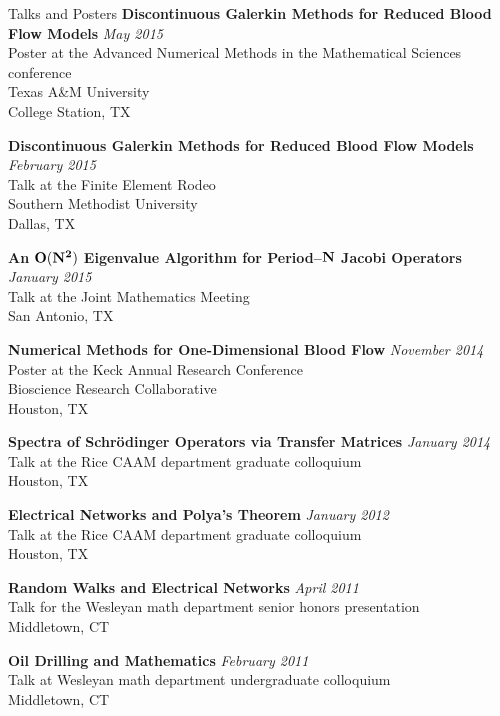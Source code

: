 \documentclass{resume} %
\begin{document}
\begin{rSection}{Talks and Posters}
{\bf Discontinuous Galerkin Methods for Reduced Blood Flow Models} \hfill{\em May 2015}\\
{\small Poster at the Advanced Numerical Methods in the Mathematical Sciences conference\\
Texas A\&M University \\
College Station, TX}

{\bf Discontinuous Galerkin Methods for Reduced Blood Flow Models} \hfill{\em February 2015}\\
{\small Talk at the Finite Element Rodeo \\
Southern Methodist University \\
Dallas, TX}

{\bf An ${\bf O(N^2)}$ Eigenvalue Algorithm for Period--${\bf N}$ Jacobi Operators} \hfill {\em January 2015} \\
{\small Talk at the Joint Mathematics Meeting \\
San Antonio, TX} 

{\bf Numerical Methods for One-Dimensional Blood Flow} \hfill {\em November 2014} \\
{\small Poster at the Keck Annual Research Conference \\
Bioscience Research Collaborative \\
Houston, TX} 

{\bf Spectra of Schr\"odinger Operators via Transfer Matrices}  \hfill {\em January 2014} \\
{\small Talk at the Rice CAAM department graduate colloquium \\
Houston, TX}

{\bf Electrical Networks and Polya's Theorem} \hfill {\em January 2012} \\
{\small Talk at the Rice CAAM department graduate colloquium \\
Houston, TX}

{\bf Random Walks and Electrical Networks} \hfill {\em April 2011} \\
{\small Talk for the Wesleyan math department senior honors presentation\\
Middletown, CT}

{\bf Oil Drilling and Mathematics} \hfill {\em February 2011}\\
{\small Talk at Wesleyan math department undergraduate colloquium \\
Middletown, CT}

\end{rSection}





\end{document}
